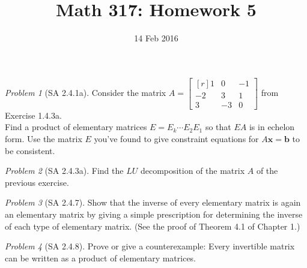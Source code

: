 \documentclass[fleqn,11pt]{paper}
\title{Math 317: Homework 5}
\date{14 Feb 2016}
\theoremstyle{remark}
\newtheorem{problem}{Problem}
\renewcommand{\vec}[1]{\mathbf{#1}}
\newcommand{\<}{\ensuremath{\langle}}
\renewcommand{\>}{\ensuremath{\rangle}}
\newcommand\vb{\vec{b}}
\newcommand\vx{\vec{x}}
\begin{document}
\maketitle

\begin{problem}[SA 2.4.1a]
Consider the matrix 
$A = \begin{bmatrix*}[r] 1 & 0&-1 \\ -2&3 &1 \\3&-3 &0 \end{bmatrix*}$
from Exercise 1.4.3a.\\[6pt]
Find a product of elementary matrices $E = E_k \cdots E_2 E_1$
so that $EA$ is in echelon form. Use the matrix $E$ you've found to give
constraint equations for $A\vx = \vb$ to be consistent.
\end{problem}

\probskip

\begin{problem}[SA 2.4.3a]
Find the $LU$ decomposition of the matrix $A$ of the previous exercise.
\end{problem}

\probskip



\begin{problem}[SA 2.4.7]
Show that the inverse of every elementary matrix is again an elementary matrix
by giving a simple prescription for determining the inverse of each type of
elementary matrix. (See the proof of Theorem 4.1 of Chapter 1.)
\end{problem}

\probskip

\begin{problem}[SA 2.4.8]
Prove or give a counterexample: Every invertible matrix can be written as a
product of elementary matrices.
\end{problem}
\end{document}
